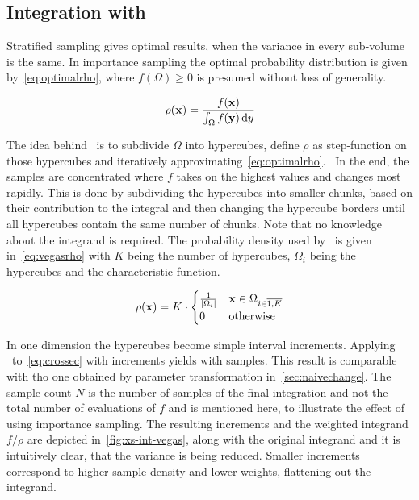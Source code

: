 \subsection{Integration with \vegas}
\label{sec:mcintvegas}

Stratified sampling gives optimal results, when the variance in every
sub-volume is the same. In importance sampling the optimal probability
distribution is given by~\eqref{eq:optimalrho}, where
\(f(\Omega) \geq 0\) is presumed without loss of generality.

\begin{equation}
  \label{eq:optimalrho}
  \rho(\vb{x}) = \frac{f(\vb{x})}{\int_\Omega f(\vb{y})\dd{y}}
\end{equation}

The idea behind \vegas\ is to subdivide \(\Omega\) into hypercubes,
define \(\rho\) as step-function on those hypercubes and iteratively
approximating~\eqref{eq:optimalrho}.~\cite{Lepage:19781an} In the end,
the samples are concentrated where \(f\) takes on the highest values
and changes most rapidly. This is done by subdividing the hypercubes
into smaller chunks, based on their contribution to the integral and
then changing the hypercube borders until all hypercubes contain the
same number of chunks. Note that no knowledge about the integrand is
required. The probability density used by \vegas\ is given
in~\eqref{eq:vegasrho} with \(K\) being the number of hypercubes,
\(\Omega_i\) being the hypercubes and  the
characteristic function.

\begin{equation}
  \label{eq:vegasrho}
  \rho(\vb{x}) = K\cdot
  \begin{cases}
    \frac{1}{\abs{\Omega_i}} & \vb{x}\in\Omega_{i\in\overline{1,K}} \\
    0 & \text{otherwise}
  \end{cases}
\end{equation}

In one dimension the hypercubes become simple interval
increments. Applying \vegas\ to~\eqref{eq:crossec} with
 increments yields
 with
 samples. This result is comparable
with tho one obtained by parameter transformation
in~\ref{sec:naivechange}.  The sample count \(N\) is the number of
samples of the final integration and not the total number of
evaluations of \(f\) and is mentioned here, to illustrate the effect
of using importance sampling. The resulting increments and the
weighted integrand \(f/\rho\) are depicted in~\ref{fig:xs-int-vegas},
along with the original integrand and it is intuitively clear, that the
variance is being reduced. Smaller increments correspond to higher
sample density and lower weights, flattening out the integrand.

